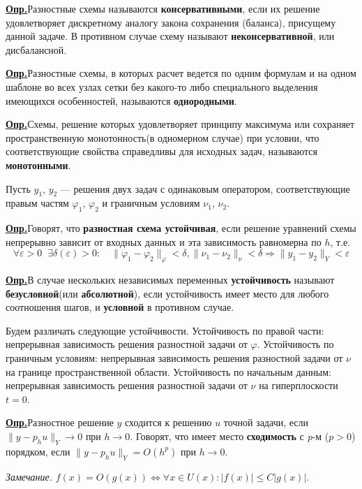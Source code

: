 \documentclass[12pt, a4paper]{article}
\newcommand{\opr}{\textbf{\underline{{Опр.}}}\quad}
\renewcommand{\phi}{\varphi}
\begin{document}
	\opr Разностные схемы называются \textbf{консервативными}, если их решение удовлетворяет дискретному аналогу закона сохранения (баланса), присущему данной задаче. В противном случае схему называют \textbf{неконсервативной}, или дисбалансной.
	
	\opr Разностные схемы, в которых расчет ведется по одним формулам и на одном шаблоне во всех узлах сетки без какого-то либо специального выделения имеющихся особенностей, называются \textbf{однородными}. 
	
	\opr Схемы, решение которых удовлетворяет принципу максимума или сохраняет пространственную монотонность(в одномерном случае) при условии, что соответствующие свойства справедливы для исходных задач, называются \textbf{монотонными}. 
	
	Пусть $y_1$, $y_2$ --- решения двух задач с одинаковым оператором, соответствующие правым частям $\phi_1$, $\phi_2$ и граничным условиям $\nu_1$, $\nu_2$.
	
	\opr Говорят, что \textbf{разностная схема устойчивая}, если решение уравнений схемы непрерывно зависит от входных данных и эта зависимость равномерна по $h$, т.е.
	\begin{equation*}
		\forall \varepsilon > 0 \phantom{x}\exists \delta(\varepsilon) > 0: \quad \parallel \phi_1 - \phi_2 \parallel_\phi < \delta,   \parallel \nu_1 - \nu_2 \parallel_\nu <  \delta \Rightarrow \parallel y_1 - y_2 \parallel_Y < \varepsilon
	\end{equation*}	
	
	\opr В случае нескольких независимых переменных \textbf{устойчивость} называют \textbf{безусловной}(или \textbf{абсолютной}), если устойчивость имеет место для любого соотношения шагов, и \textbf{условной} в противном случае.
	
	Будем различать следующие устойчивости. Устойчивость по правой части: непрерывная зависимость решения разностной задачи от $\phi$. Устойчивость по граничным условиям: непрерывная зависимость решения разностной задачи от $\nu$ на границе пространственной области. Устойчивость по начальным данным: непрерывная зависимость решения разностной задачи от $\nu$ на гиперплоскости $t=0$.
	
	\opr Разностное решение $y$ сходится к решению $u$ точной задачи, если \\
	\mbox{$\| y - p_h u \|_Y \to 0$} при $h \to 0$. Говорят, что имеет место \textbf{сходимость} с \textit{p}-м ($p > 0$) порядком, если $\| y - p_h u \|_Y = O(h^p)$ при $h \to 0$.
	
	\textsl{Замечание.} $f(x) = O(g(x)) \Leftrightarrow \forall x \in U(x): |f(x)| \le C|g(x)|$.
	
\end{document}
